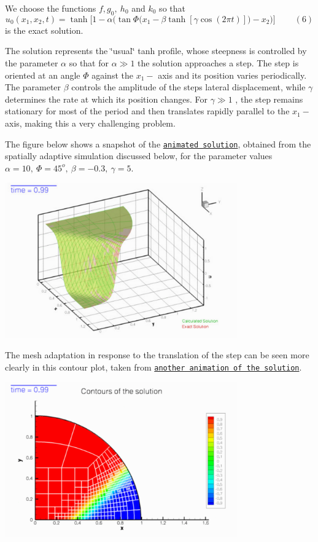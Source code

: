 We choose the functions $ f, g_0, \ h_0 $ and $ k_0 $ so that \[ u_0(x_1,x_2,t) = \tanh\bigg[ 1-\alpha\bigg( \tan\Phi \big(x_1-\beta\tanh[ \gamma\cos\left(2\pi t\right)]\big)- x_2\bigg)\bigg] \ \ \ \ \ \ \ \ \ \ (6) \] is the exact solution.

The solution represents the \char`\"{}usual\char`\"{} tanh profile, whose steepness is controlled by the parameter $ \alpha $ so that for $ \alpha \gg 1 $ the solution approaches a step. The step is oriented at an angle $ \Phi $ against the $ x_1- $ axis and its position varies periodically. The parameter $ \beta $ controls the amplitude of the step\textquotesingle{}s lateral displacement, while $ \gamma $ determines the rate at which its position changes. For $ \gamma \gg 1 $ , the step remains stationary for most of the period and then translates rapidly parallel to the $ x_1- $ axis, making this a very challenging problem.

The figure below shows a snapshot of the \href{../figures/step_soln.avi}{\tt animated solution}, obtained from the spatially adaptive simulation discussed below, for the parameter values $ \alpha=10, \ \Phi=45^o, \ \beta=-0.3, \ \gamma=5. $

 
\begin{DoxyImage}
\includegraphics[width=0.75\textwidth]{step_soln}
\end{DoxyImage}


The mesh adaptation in response to the translation of the step can be seen more clearly in this contour plot, taken from \href{../figures/unsteady_heat_contour.avi}{\tt another animation of the solution}.

 
\begin{DoxyImage}
\includegraphics[width=0.75\textwidth]{unsteady_heat_contour}
\end{DoxyImage}




